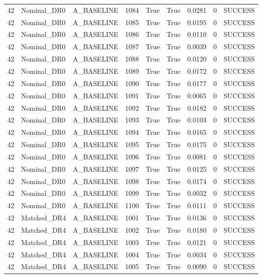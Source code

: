 \documentclass[11pt,a4paper,oneside]{book}
\begin{document}
\begin{longtable}{l l l l l l l l l}
42 & Nominal\_DR0 & A\_BASELINE & 1084 & True & True & 0.0281 & 0 & SUCCESS \\
42 & Nominal\_DR0 & A\_BASELINE & 1085 & True & True & 0.0195 & 0 & SUCCESS \\
42 & Nominal\_DR0 & A\_BASELINE & 1086 & True & True & 0.0110 & 0 & SUCCESS \\
42 & Nominal\_DR0 & A\_BASELINE & 1087 & True & True & 0.0039 & 0 & SUCCESS \\
42 & Nominal\_DR0 & A\_BASELINE & 1088 & True & True & 0.0120 & 0 & SUCCESS \\
42 & Nominal\_DR0 & A\_BASELINE & 1089 & True & True & 0.0172 & 0 & SUCCESS \\
42 & Nominal\_DR0 & A\_BASELINE & 1090 & True & True & 0.0177 & 0 & SUCCESS \\
42 & Nominal\_DR0 & A\_BASELINE & 1091 & True & True & 0.0065 & 0 & SUCCESS \\
42 & Nominal\_DR0 & A\_BASELINE & 1092 & True & True & 0.0182 & 0 & SUCCESS \\
42 & Nominal\_DR0 & A\_BASELINE & 1093 & True & True & 0.0103 & 0 & SUCCESS \\
42 & Nominal\_DR0 & A\_BASELINE & 1094 & True & True & 0.0165 & 0 & SUCCESS \\
42 & Nominal\_DR0 & A\_BASELINE & 1095 & True & True & 0.0175 & 0 & SUCCESS \\
42 & Nominal\_DR0 & A\_BASELINE & 1096 & True & True & 0.0081 & 0 & SUCCESS \\
42 & Nominal\_DR0 & A\_BASELINE & 1097 & True & True & 0.0125 & 0 & SUCCESS \\
42 & Nominal\_DR0 & A\_BASELINE & 1098 & True & True & 0.0174 & 0 & SUCCESS \\
42 & Nominal\_DR0 & A\_BASELINE & 1099 & True & True & 0.0032 & 0 & SUCCESS \\
42 & Nominal\_DR0 & A\_BASELINE & 1100 & True & True & 0.0111 & 0 & SUCCESS \\
42 & Matched\_DR4 & A\_BASELINE & 1001 & True & True & 0.0136 & 0 & SUCCESS \\
42 & Matched\_DR4 & A\_BASELINE & 1002 & True & True & 0.0180 & 0 & SUCCESS \\
42 & Matched\_DR4 & A\_BASELINE & 1003 & True & True & 0.0121 & 0 & SUCCESS \\
42 & Matched\_DR4 & A\_BASELINE & 1004 & True & True & 0.0034 & 0 & SUCCESS \\
42 & Matched\_DR4 & A\_BASELINE & 1005 & True & True & 0.0090 & 0 & SUCCESS \\

\end{longtable}
\end{document}
